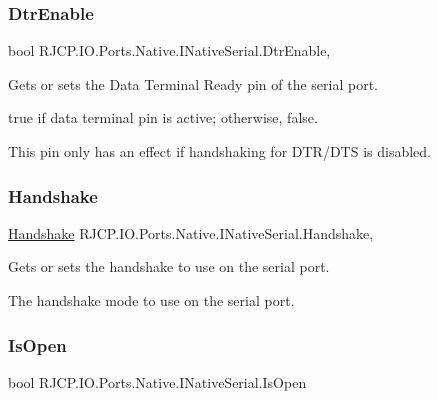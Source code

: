 \subsubsection{\texorpdfstring{DtrEnable}{DtrEnable}}
{\footnotesize\ttfamily bool R\+J\+C\+P.\+I\+O.\+Ports.\+Native.\+I\+Native\+Serial.\+Dtr\+Enable\hspace{0.3cm}{\ttfamily [get]}, {\ttfamily [set]}}



Gets or sets the Data Terminal Ready pin of the serial port. 

{\ttfamily true} if data terminal pin is active; otherwise, {\ttfamily false}. 

This pin only has an effect if handshaking for D\+T\+R/\+D\+TS is disabled. \mbox{\label{interface_r_j_c_p_1_1_i_o_1_1_ports_1_1_native_1_1_i_native_serial_ad0b78a17818f0deff10ee0a4bf859497}} 
\subsubsection{\texorpdfstring{Handshake}{Handshake}}
{\footnotesize\ttfamily \mbox{\hyperlink{namespace_r_j_c_p_1_1_i_o_1_1_ports_a5328e888558ed5726b3fb7b8b692527c}{Handshake}} R\+J\+C\+P.\+I\+O.\+Ports.\+Native.\+I\+Native\+Serial.\+Handshake\hspace{0.3cm}{\ttfamily [get]}, {\ttfamily [set]}}



Gets or sets the handshake to use on the serial port. 

The handshake mode to use on the serial port. \mbox{\label{interface_r_j_c_p_1_1_i_o_1_1_ports_1_1_native_1_1_i_native_serial_a2f77d45e27094dc1451010cbe1c14be0}} 
\subsubsection{\texorpdfstring{IsOpen}{IsOpen}}
{\footnotesize\ttfamily bool R\+J\+C\+P.\+I\+O.\+Ports.\+Native.\+I\+Native\+Serial.\+Is\+Open\hspace{0.3cm}{\ttfamily [get]}}



